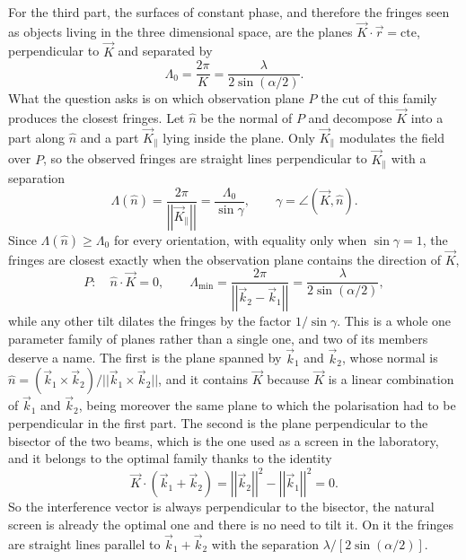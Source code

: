         For the third part, the surfaces of constant phase, and therefore the fringes seen as objects living in the three dimensional space, are the planes $\vec{K}\cdot\vec{r} = \text{cte}$, perpendicular to $\vec{K}$ and separated by
        \begin{equation}\label{eq:P1Lambda0}
            \Lambda_0 = \frac{2\pi}{K} = \frac{\lambda}{2\sin(\alpha/2)}.
        \end{equation}
        What the question asks is on which observation plane $P$ the cut of this family produces the closest fringes. Let $\hat{n}$ be the normal of $P$ and decompose $\vec{K}$ into a part along $\hat{n}$ and a part $\vec{K}_\parallel$ lying inside the plane. Only $\vec{K}_\parallel$ modulates the field over $P$, so the observed fringes are straight lines perpendicular to $\vec{K}_\parallel$ with a separation
        \begin{equation}
            \Lambda(\hat{n}) = \frac{2\pi}{\left|\left|\vec{K}_\parallel\right|\right|} = \frac{\Lambda_0}{\sin\gamma}, \qquad \gamma = \angle(\vec{K},\hat{n}).
        \end{equation}
        Since $\Lambda(\hat{n}) \geq \Lambda_0$ for every orientation, with equality only when $\sin\gamma = 1$, the fringes are closest exactly when the observation plane contains the direction of $\vec{K}$,
        \begin{equation}\label{eq:P1Pmin}
            P:\quad \hat{n}\cdot\vec{K} = 0, \qquad \Lambda_{\min} = \frac{2\pi}{\left|\left|\vec{k}_2-\vec{k}_1\right|\right|} = \frac{\lambda}{2\sin(\alpha/2)},
        \end{equation}
        while any other tilt dilates the fringes by the factor $1/\sin\gamma$. This is a whole one parameter family of planes rather than a single one, and two of its members deserve a name. The first is the plane spanned by $\vec{k}_1$ and $\vec{k}_2$, whose normal is $\hat{n} = (\vec{k}_1\times\vec{k}_2)/||\vec{k}_1\times\vec{k}_2||$, and it contains $\vec{K}$ because $\vec{K}$ is a linear combination of $\vec{k}_1$ and $\vec{k}_2$, being moreover the same plane to which the polarisation had to be perpendicular in the first part. The second is the plane perpendicular to the bisector of the two beams, which is the one used as a screen in the laboratory, and it belongs to the optimal family thanks to the identity
        \begin{equation}
            \vec{K}\cdot(\vec{k}_1+\vec{k}_2) = \left|\left|\vec{k}_2\right|\right|^2 - \left|\left|\vec{k}_1\right|\right|^2 = 0.
        \end{equation}
        So the interference vector is always perpendicular to the bisector, the natural screen is already the optimal one and there is no need to tilt it. On it the fringes are straight lines parallel to $\vec{k}_1+\vec{k}_2$ with the separation $\lambda/[2\sin(\alpha/2)]$.

